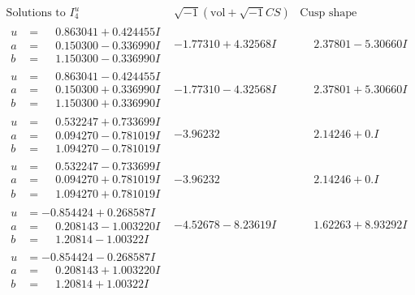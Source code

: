 \documentclass[1p]{elsarticle_modified}
\theoremstyle{definition}
\newcommand{\I}{\sqrt{-1}}
\begin{document}
$$\begin{array}{c|c|c}  
\text{Solutions to }I^u_{4}& \I (\text{vol} + \sqrt{-1}CS) & \text{Cusp shape}\\
 \hline 
\begin{aligned}
u &= \phantom{-}0.863041 + 0.424455 I \\
a &= \phantom{-}0.150300 - 0.336990 I \\
b &= \phantom{-}1.150300 - 0.336990 I\end{aligned}
 & -1.77310 + 4.32568 I & \phantom{-}2.37801 - 5.30660 I \\ \hline\begin{aligned}
u &= \phantom{-}0.863041 - 0.424455 I \\
a &= \phantom{-}0.150300 + 0.336990 I \\
b &= \phantom{-}1.150300 + 0.336990 I\end{aligned}
 & -1.77310 - 4.32568 I & \phantom{-}2.37801 + 5.30660 I \\ \hline\begin{aligned}
u &= \phantom{-}0.532247 + 0.733699 I \\
a &= \phantom{-}0.094270 - 0.781019 I \\
b &= \phantom{-}1.094270 - 0.781019 I\end{aligned}
 & -3.96232\phantom{ +0.000000I} & \phantom{-}2.14246 + 0. I\phantom{ +0.000000I} \\ \hline\begin{aligned}
u &= \phantom{-}0.532247 - 0.733699 I \\
a &= \phantom{-}0.094270 + 0.781019 I \\
b &= \phantom{-}1.094270 + 0.781019 I\end{aligned}
 & -3.96232\phantom{ +0.000000I} & \phantom{-}2.14246 + 0. I\phantom{ +0.000000I} \\ \hline\begin{aligned}
u &= -0.854424 + 0.268587 I \\
a &= \phantom{-}0.208143 - 1.003220 I \\
b &= \phantom{-}1.20814 - 1.00322 I\end{aligned}
 & -4.52678 - 8.23619 I & \phantom{-}1.62263 + 8.93292 I \\ \hline\begin{aligned}
u &= -0.854424 - 0.268587 I \\
a &= \phantom{-}0.208143 + 1.003220 I \\
b &= \phantom{-}1.20814 + 1.00322 I\end{aligned}

\end{array}$$
\end{document}
